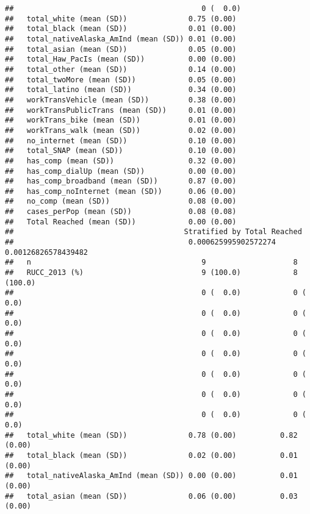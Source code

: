\documentclass[
]{article}
\begin{document}
\begin{verbatim}
##                                           0 (  0.0)        
##   total_white (mean (SD))              0.75 (0.00)         
##   total_black (mean (SD))              0.01 (0.00)         
##   total_nativeAlaska_AmInd (mean (SD)) 0.01 (0.00)         
##   total_asian (mean (SD))              0.05 (0.00)         
##   total_Haw_PacIs (mean (SD))          0.00 (0.00)         
##   total_other (mean (SD))              0.14 (0.00)         
##   total_twoMore (mean (SD))            0.05 (0.00)         
##   total_latino (mean (SD))             0.34 (0.00)         
##   workTransVehicle (mean (SD))         0.38 (0.00)         
##   workTransPublicTrans (mean (SD))     0.01 (0.00)         
##   workTrans_bike (mean (SD))           0.01 (0.00)         
##   workTrans_walk (mean (SD))           0.02 (0.00)         
##   no_internet (mean (SD))              0.10 (0.00)         
##   total_SNAP (mean (SD))               0.10 (0.00)         
##   has_comp (mean (SD))                 0.32 (0.00)         
##   has_comp_dialUp (mean (SD))          0.00 (0.00)         
##   has_comp_broadband (mean (SD))       0.87 (0.00)         
##   has_comp_noInternet (mean (SD))      0.06 (0.00)         
##   no_comp (mean (SD))                  0.08 (0.00)         
##   cases_perPop (mean (SD))             0.08 (0.08)         
##   Total Reached (mean (SD))            0.00 (0.00)         
##                                       Stratified by Total Reached
##                                        0.000625995902572274 0.00126826578439482
##   n                                       9                    8               
##   RUCC_2013 (%)                           9 (100.0)            8 (100.0)       
##                                           0 (  0.0)            0 (  0.0)       
##                                           0 (  0.0)            0 (  0.0)       
##                                           0 (  0.0)            0 (  0.0)       
##                                           0 (  0.0)            0 (  0.0)       
##                                           0 (  0.0)            0 (  0.0)       
##                                           0 (  0.0)            0 (  0.0)       
##                                           0 (  0.0)            0 (  0.0)       
##   total_white (mean (SD))              0.78 (0.00)          0.82 (0.00)        
##   total_black (mean (SD))              0.02 (0.00)          0.01 (0.00)        
##   total_nativeAlaska_AmInd (mean (SD)) 0.00 (0.00)          0.01 (0.00)        
##   total_asian (mean (SD))              0.06 (0.00)          0.03 (0.00)        

\end{verbatim}
\end{document}
